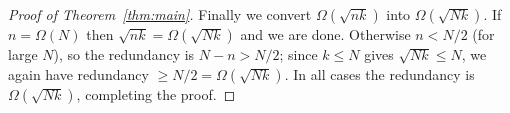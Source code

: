 \begin{proof}[Proof of Theorem~\ref{thm:main}]
  Finally we convert $\Omega(\sqrt{nk})$ into $\Omega(\sqrt{Nk})$. If
  $n = \Omega(N)$ then $\sqrt{nk} = \Omega(\sqrt{Nk})$ and we are done. Otherwise
  $n < N/2$ (for large $N$), so the redundancy is $N - n > N/2$; since
  $k \le N$ gives $\sqrt{Nk} \le N$, we again have redundancy
  $\ge N/2 = \Omega(\sqrt{Nk})$. In all cases the redundancy is
  $\Omega(\sqrt{Nk})$, completing the proof.
\end{proof}
